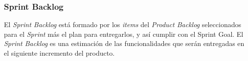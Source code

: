     
    
\subsubsection{Sprint Backlog}
    
 El {\it Sprint Backlog} está formado por los {\it items} del {\it Product Backlog} seleccionados
 para el {\it Sprint} más el plan para entregarlos, y así cumplir con el Sprint Goal. El {\it Sprint
 Backlog} es una estimación de las funcionalidades que serán entregadas en el siguiente incremento
 del producto.

    

\clearpage
